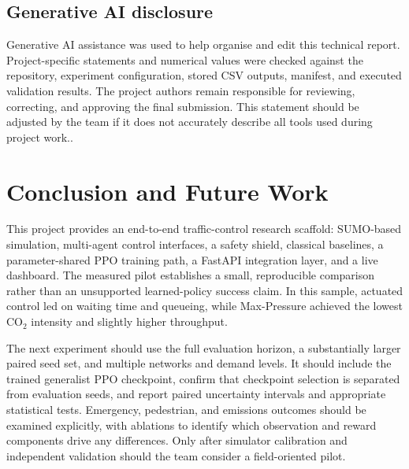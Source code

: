\documentclass[11pt,a4paper]{article}
\begin{document}
\subsection{Generative AI disclosure}
Generative AI assistance was used to help organise and edit this technical report.
Project-specific statements and numerical values were checked against the repository,
experiment configuration, stored CSV outputs, manifest, and executed validation
results. The project authors remain responsible for reviewing, correcting, and
approving the final submission. This statement should be adjusted by the team if it
does not accurately describe all tools used during project work..

\section{Conclusion and Future Work}
This project provides an end-to-end traffic-control research scaffold: SUMO-based
simulation, multi-agent control interfaces, a safety shield, classical baselines, a
parameter-shared PPO training path, a FastAPI integration layer, and a live dashboard.
The measured pilot establishes a small, reproducible comparison rather than an
unsupported learned-policy success claim. In this sample, actuated control led on
waiting time and queueing, while Max-Pressure achieved the lowest CO$_2$ intensity and
slightly higher throughput.

The next experiment should use the full evaluation horizon, a substantially larger
paired seed set, and multiple networks and demand levels. It should include the
trained generalist PPO checkpoint, confirm that checkpoint selection is separated
from evaluation seeds, and report paired uncertainty intervals and appropriate
statistical tests. Emergency, pedestrian, and emissions outcomes should be examined
explicitly, with ablations to identify which observation and reward components drive
any differences. Only after simulator calibration and independent validation should
the team consider a field-oriented pilot.
\end{document}
